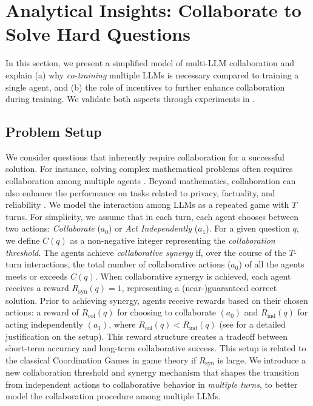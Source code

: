 \safevspace{-2.2mm}
\safevspace{-1.5mm}

\section{Analytical Insights: Collaborate  to Solve Hard Questions}
\safevspace{-2.2mm}
\label{sec:theory}
In this section, we present a simplified model of multi-LLM collaboration and explain (a) why {\it co-training}  multiple LLMs is necessary compared to training a single agent,  and (b) the role of incentives to further enhance collaboration during training. We validate both aspects through experiments in .
\safevspace{-2.2mm}
\safevspace{-1.5mm}


\subsection{Problem Setup}
\safevspace{-2.2mm}

We consider questions that inherently require collaboration for a successful solution. For instance, solving complex mathematical problems often requires  collaboration  among  multiple agents \citep{liang2023encouraging, du2023improving}. Beyond mathematics, collaboration can also enhance the performance on tasks related to privacy, factuality, and reliability \citep{feng2025llmdroolsmultillmcollaboration}.
{We model the interaction among LLMs as a repeated game with $T$ turns}. 
For simplicity, we assume that in each turn, each agent chooses between two actions: \textit{Collaborate} ($a_0$) or \textit{Act Independently} ($a_1$). For a given question $q$, we define \(C(q)\) as a non-negative integer representing the \textit{collaboration threshold}. The agents achieve \textit{collaborative synergy} if, over the course of the $T$-turn interactions, the total number of collaborative actions (\(a_0\)) of all the agents meets or exceeds \(C(q)\).
When collaborative synergy is achieved, each agent receives a reward \(R_{\text{syn}}(q) = 1\), representing a (near-)guaranteed correct solution. Prior to achieving synergy, agents receive rewards based on their chosen actions: a reward of \(R_{\text{col}}(q)\) for choosing to collaborate \((a_0)\) and \(R_{\text{ind}}(q)\) for acting independently \((a_1)\), where \(R_{\text{col}}(q) < R_{\text{ind}}(q)\) (see  for a detailed  justification on the setup). This reward structure creates a tradeoff between short-term accuracy and long-term collaborative success. {This  setup is related to the classical Coordination Games  \cite{cooper1999coordination} in game theory if $R_{\text{syn}}$ is large}. We introduce a new collaboration threshold and synergy mechanism that shapes the transition from independent actions to collaborative behavior {in {\it multiple turns}}, to better model the collaboration procedure among multiple LLMs. 

